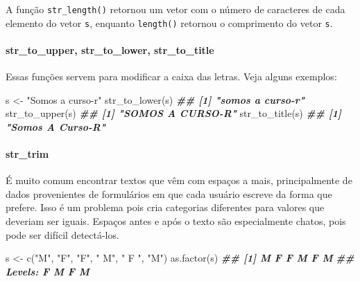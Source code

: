 \documentclass[
]{book}
\newenvironment{Shaded}{\begin{snugshade}}{\end{snugshade}}
\newcommand{\DocumentationTok}[1]{\textcolor[rgb]{0.56,0.35,0.01}{\textbf{\textit{#1}}}}
\newcommand{\FunctionTok}[1]{\textcolor[rgb]{0.00,0.00,0.00}{#1}}
\newcommand{\NormalTok}[1]{#1}
\newcommand{\OtherTok}[1]{\textcolor[rgb]{0.56,0.35,0.01}{#1}}
\newcommand{\StringTok}[1]{\textcolor[rgb]{0.31,0.60,0.02}{#1}}
\begin{document}
A função \texttt{str\_length()} retornou um vetor com o número de caracteres de cada elemento do vetor \texttt{s}, enquanto \texttt{length()} retornou o comprimento do vetor \texttt{s}.

\hypertarget{str_to_upper-str_to_lower-str_to_title}{%
\paragraph*{str\_to\_upper, str\_to\_lower, str\_to\_title}\label{str_to_upper-str_to_lower-str_to_title}}

Essas funções servem para modificar a caixa das letras. Veja alguns exemplos:

\begin{Shaded}
\begin{Highlighting}[]
\NormalTok{s }\OtherTok{\textless{}{-}} \StringTok{"Somos a curso{-}r"}
\FunctionTok{str\_to\_lower}\NormalTok{(s)}
\DocumentationTok{\#\# [1] "somos a curso{-}r"}
\FunctionTok{str\_to\_upper}\NormalTok{(s)}
\DocumentationTok{\#\# [1] "SOMOS A CURSO{-}R"}
\FunctionTok{str\_to\_title}\NormalTok{(s)}
\DocumentationTok{\#\# [1] "Somos A Curso{-}R"}
\end{Highlighting}
\end{Shaded}

\hypertarget{str_trim}{%
\paragraph*{str\_trim}\label{str_trim}}

É muito comum encontrar textos que vêm com espaços a mais, principalmente de dados
provenientes de formulários em que cada usuário escreve da forma que prefere. Isso é um problema pois cria categorias diferentes para valores que deveriam ser iguais. Espaços antes e após o texto são especialmente chatos, pois pode ser difícil detectá-los.

\begin{Shaded}
\begin{Highlighting}[]
\NormalTok{s }\OtherTok{\textless{}{-}} \FunctionTok{c}\NormalTok{(}\StringTok{"M"}\NormalTok{, }\StringTok{"F"}\NormalTok{, }\StringTok{"F"}\NormalTok{, }\StringTok{" M"}\NormalTok{, }\StringTok{" F "}\NormalTok{, }\StringTok{"M"}\NormalTok{)}
\FunctionTok{as.factor}\NormalTok{(s)}
\DocumentationTok{\#\# [1] M   F   F    M   F  M  }
\DocumentationTok{\#\# Levels:  F   M F M}
\end{Highlighting}
\end{Shaded}
\end{document}
